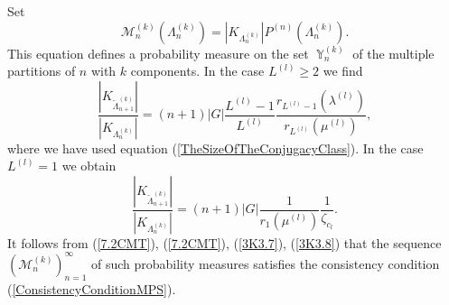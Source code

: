 \documentclass[12pt]{amsart}
\theoremstyle{definition}
\numberwithin{equation}{section}
\DeclareMathOperator{\Y}{\mathbb{Y}}
\newcommand{\tLambda}{\widetilde{\Lambda}}
\begin{document}
Set
$$
\mathcal{M}_n^{(k)}\left(\Lambda_n^{(k)}\right)=\left|K_{\Lambda_n^{(k)}}\right|
P^{(n)}\left(\Lambda_n^{(k)}\right).
$$
This equation defines a probability measure on the set $\Y_n^{(k)}$ of the multiple partitions of $n$ with $k$ components.
In the case $L^{(l)}\geq 2$ we find
\begin{equation}\label{3K3.7}
\frac{\left|K_{\tLambda_{n+1}^{(k)}}\right|}{\left|K_{\Lambda_n^{(k)}}\right|}
=(n+1)\left|G\right|\frac{L^{(l)}-1}{L^{(l)}}
\frac{r_{L^{(l)}-1}\left(\lambda^{(l)}\right)}{r_{L^{(l)}}\left(\mu^{(l)}\right)},
\end{equation}
where we have used equation (\ref{TheSizeOfTheConjugacyClass}). In the case $L^{(l)}=1$ we obtain
\begin{equation}\label{3K3.8}
\frac{\left|K_{\tLambda_{n+1}^{(k)}}\right|}{\left|K_{\Lambda_n^{(k)}}\right|}
=(n+1)\left|G\right|
\frac{1}{r_{1}\left(\mu^{(l)}\right)}\frac{1}{\zeta_{c_l}}.
\end{equation}
It follows from (\ref{7.2CMT}), (\ref{7.2CMT}), (\ref{3K3.7}), (\ref{3K3.8}) that the sequence
$\left(\mathcal{M}_n^{(k)}\right)_{n=1}^{\infty}$ of such probability measures satisfies the consistency condition (\ref{ConsistencyConditionMPS}).
\end{document}
